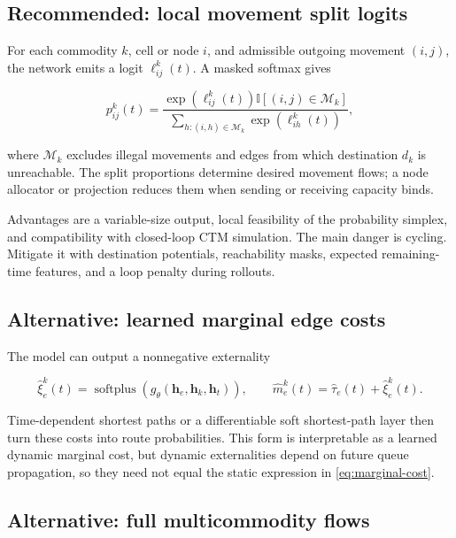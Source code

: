 \documentclass[11pt]{article}
\newcommand{\ind}{\mathbb{I}}
\newcommand{\softplus}{\operatorname{softplus}}
\newcommand{\vect}[1]{\bm{#1}}
\begin{document}
\subsection{Recommended: local movement split logits}

For each commodity \(k\), cell or node \(i\), and admissible outgoing movement
\((i,j)\), the network emits a logit \(\ell_{ij}^k(t)\).  A masked softmax gives

\begin{equation}
  p_{ij}^k(t)
  = \frac{\exp(\ell_{ij}^k(t))\ind[(i,j)\in\mathcal{M}_k]}
  {\sum_{h:(i,h)\in\mathcal{M}_k}\exp(\ell_{ih}^k(t))},
  \label{eq:turn-softmax}
\end{equation}

where \(\mathcal{M}_k\) excludes illegal movements and edges from which destination
\(d_k\) is unreachable.  The split proportions determine desired movement flows; a
node allocator or projection reduces them when sending or receiving capacity binds.

Advantages are a variable-size output, local feasibility of the probability simplex,
and compatibility with closed-loop CTM simulation.  The main danger is cycling.
Mitigate it with destination potentials, reachability masks, expected remaining-time
features, and a loop penalty during rollouts.

\subsection{Alternative: learned marginal edge costs}

The model can output a nonnegative externality

\begin{equation}
  \widehat{\xi}_e^k(t)
  = \softplus(g_\theta(\vect{h}_e,\vect{h}_k,\vect{h}_t)),
  \qquad
  \widehat{m}_e^k(t)=\widehat{\tau}_e(t)+\widehat{\xi}_e^k(t).
  \label{eq:learned-cost}
\end{equation}

Time-dependent shortest paths or a differentiable soft shortest-path layer then turn
these costs into route probabilities.  This form is interpretable as a learned dynamic
marginal cost, but dynamic externalities depend on future queue propagation, so they
need not equal the static expression in \cref{eq:marginal-cost}.

\subsection{Alternative: full multicommodity flows}
\end{document}
